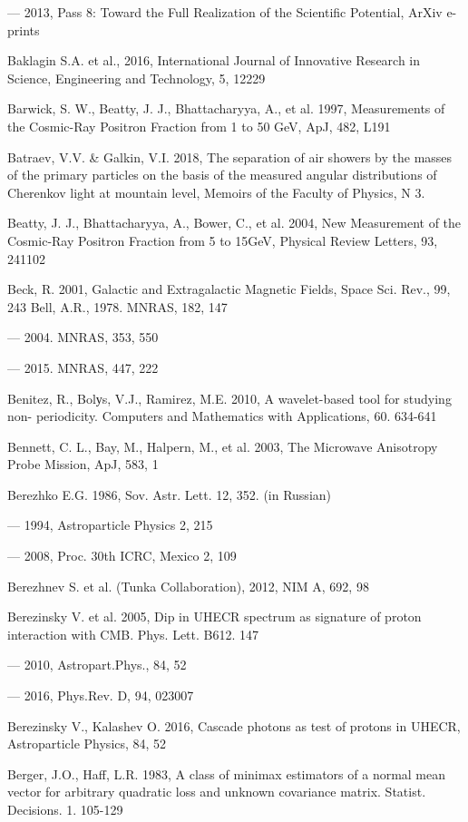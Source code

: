 --- 2013, Pass 8: Toward the Full Realization of the \fermilat{} Scientific Potential, ArXiv e-prints

Baklagin S.A. et al., 2016, International Journal of Innovative Research in Science, Engineering and Technology, 5, 12229

Barwick, S. W., Beatty, J. J., Bhattacharyya, A., et al. 1997, Measurements of the Cosmic-Ray Positron Fraction from 1 to 50 GeV, ApJ, 482, L191

Batraev, V.V. \& Galkin, V.I. 2018, The separation of air showers by the masses of the primary particles on the basis of the measured angular distributions of Cherenkov light at mountain level, Memoirs of the Faculty of Physics, N 3.

Beatty, J. J., Bhattacharyya, A., Bower, C., et al. 2004, New Measurement of the Cosmic-Ray Positron Fraction from 5 to 15GeV, Physical Review Letters, 93, 241102

Beck, R. 2001, Galactic and Extragalactic Magnetic Fields, Space Sci. Rev., 99, 243 Bell, A.R., 1978. MNRAS, 182, 147

--- 2004. MNRAS, 353, 550

--- 2015. MNRAS, 447, 222

Benitez, R., Bolуs, V.J., Ramirez, M.E. 2010, A wavelet-based tool for studying non- periodicity. Computers and Mathematics with Applications, 60. 634-641

Bennett, C. L., Bay, M., Halpern, M., et al. 2003, The Microwave Anisotropy Probe Mission, ApJ, 583, 1

Berezhko E.G. 1986, Sov. Astr. Lett. 12, 352. (in Russian)

--- 1994, Astroparticle Physics 2, 215

--- 2008, Proc. 30th ICRC, Mexico 2, 109

Berezhnev S. et al. (Tunka Collaboration), 2012, NIM A, 692, 98

Berezinsky V. et al. 2005, Dip in UHECR spectrum as signature of proton interaction with CMB. Phys. Lett. B612. 147

--- 2010, Astropart.Phys., 84, 52

--- 2016, Phys.Rev. D, 94, 023007

Berezinsky V., Kalashev O. 2016, Cascade photons as test of protons in UHECR, Astroparticle Physics, 84, 52

Berger, J.O., Haff, L.R. 1983, A class of minimax estimators of a normal mean vector for arbitrary quadratic loss and unknown covariance matrix. Statist. Decisions. 1. 105-129

